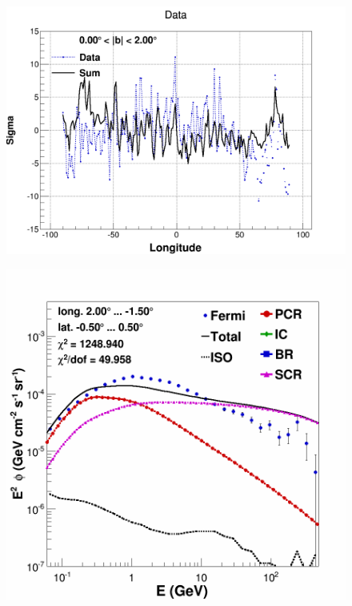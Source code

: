 \begin{figure}[h]
  \centering
  \begin{minipage}[h]{0.45\textwidth}
  	\centering
	\includegraphics[width=1.\linewidth]{pic/results/SCRonly_weniger_sum_0-2.png}
  	\subcaption{}
  	\label{fig:SCRonly_weniger}
  \end{minipage}
  \hfill
  \begin{minipage}[h]{0.45\textwidth}
	  \centering
	  \includegraphics[width=1.\linewidth]{pic/results/SCRonly_goodCMZ.png}

\end{minipage}
\end{figure}
